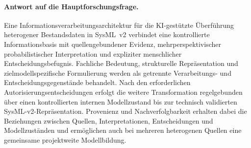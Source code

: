 \paragraph{Antwort auf die Hauptforschungsfrage.}

Eine Informationsverarbeitungsarchitektur für die KI-gestützte Überführung
heterogener Bestandsdaten in SysML~v2 verbindet eine kontrollierte
Informationsbasis mit quellengebundener Evidenz, mehrperspektivischer
probabilistischer Interpretation und expliziter menschlicher
Entscheidungsbefugnis. Fachliche Bedeutung, strukturelle Repräsentation und
zielmodellspezifische Formulierung werden als getrennte Verarbeitungs- und
Entscheidungsgegenstände behandelt. Nach den erforderlichen
Autorisierungsentscheidungen erfolgt die weitere Transformation
regelgebunden über einen kontrollierten internen Modellzustand bis zur
technisch validierten SysML-v2-Repräsentation. Provenienz und
Nachverfolgbarkeit erhalten dabei die Beziehungen zwischen Quellen,
Interpretationen, Entscheidungen und Modellzuständen und ermöglichen auch
bei mehreren heterogenen Quellen eine gemeinsame projektweite Modellbildung.